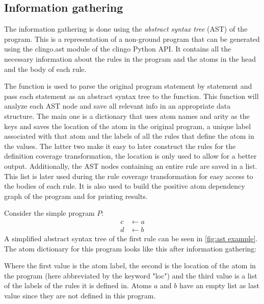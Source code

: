 \subsection{Information gathering}
\label{subsec:Computing coverage metrics for propositional programs/Implementation details/Information gathering}
The information gathering is done using the \emph{abstract syntax tree} (AST) of the program. This is a representation of a non-ground program that can be generated using the clingo.ast module of the clingo Python API. It contains all the necessary information about the rules in the program and the atoms in the head and the body of each rule. 

The  function is used to parse the original program statement by statement and pass each statement as an abstract syntax tree to the  function. This function will analyze each AST node and save all relevant info in an appropriate data structure. The main one is a dictionary that uses atom names and arity as the keys and saves the location of the atom in the original program, a unique label associated with that atom and the labels of all the rules that define the atom in the values. The latter two make it easy to later construct the rules for the definition coverage transformation, the location is only used to allow for a better output. Additionally, the AST nodes containing an entire rule are saved in a list. This list is later used during the rule coverage transformation for easy access to the bodies of each rule. It is also used to build the positive atom dependency graph of the program and for printing results.

\begin{example}
\label{ex:information gathering}
    Consider the simple program $P$:
    \begin{align*}
        c &\leftarrow a \\
        d &\leftarrow b
    \end{align*}
    A simplified abstract syntax tree of the first rule can be seen in \cref{fig:ast example}. The atom dictionary for this program looks like this after information gathering:
    

    Where the first value is the atom label, the second is the location of the atom in the program (here abbreviated by the keyword "loc") and the third value is a list of the labels of the rules it is defined in. Atoms $a$ and $b$ have an empty list as last value since they are not defined in this program.
\end{example}

